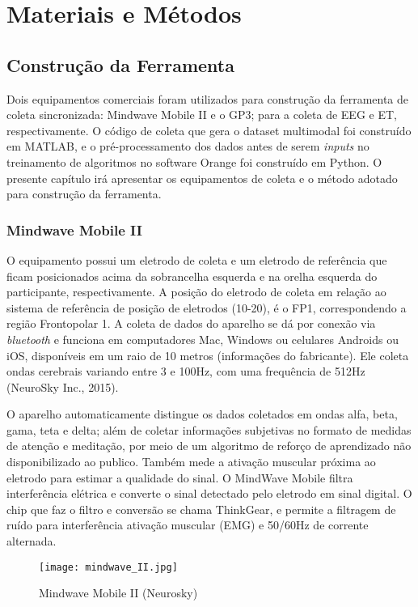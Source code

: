 \chapter{Materiais e Métodos}

\section{Construção da Ferramenta}


Dois equipamentos comerciais foram utilizados para construção da ferramenta de coleta sincronizada: 
Mindwave Mobile II e o GP3; para a coleta de EEG e ET, respectivamente. O código de coleta que gera o dataset
multimodal foi construído em MATLAB, e o pré-processamento dos dados antes de serem \textit{inputs} no treinamento
de algoritmos no software Orange foi construído em Python. O presente capítulo irá apresentar os equipamentos de coleta
e o método adotado para construção da ferramenta. 

\subsection{Mindwave Mobile II}
O equipamento possui um eletrodo de coleta e um eletrodo de referência que ficam posicionados 
acima da sobrancelha esquerda e na orelha esquerda do participante, respectivamente. 
A posição do eletrodo de coleta em relação ao sistema de referência de posição de eletrodos (10-20), é o FP1, 
correspondendo a região Frontopolar 1. A coleta de dados do aparelho se dá por conexão via \textit{bluetooth} e 
funciona em computadores Mac, Windows ou celulares Androids ou iOS, disponíveis em um raio de 10 metros (informações do fabricante). 
Ele coleta ondas cerebrais variando entre 3 e 100Hz, com uma frequência de 512Hz (NeuroSky Inc., 2015). 

O aparelho automaticamente distingue os dados coletados em ondas alfa, beta, gama, teta e delta; 
além de coletar informações subjetivas no formato de medidas de atenção e meditação, 
por meio de um algoritmo de reforço de aprendizado não disponibilizado ao publico. 
Também mede a ativação muscular próxima ao eletrodo para estimar a qualidade do sinal. 
O MindWave Mobile filtra interferência elétrica e converte o sinal detectado pelo eletrodo em sinal digital. 
O chip que faz o filtro e conversão se chama ThinkGear, e permite a filtragem de ruído para interferência ativação muscular (EMG) e 50/60Hz de corrente alternada. 

\begin{figure}
    \centering
    \texttt{[image: mindwave\_II.jpg]}
    \caption{Mindwave Mobile II (Neurosky)}
\end{figure}

